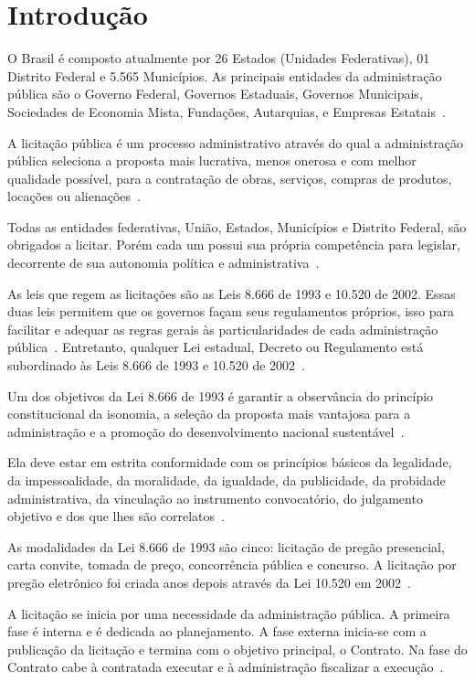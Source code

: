 \chapter*[Introdução]{Introdução}

O Brasil é composto atualmente por 26 Estados (Unidades Federativas), 01 Distrito Federal e 5.565 Municípios.
As principais entidades da administração pública são o Governo Federal, Governos Estaduais, Governos Municipais, Sociedades de Economia Mista, Fundações, Autarquias, e Empresas Estatais~\cite{thesing2012municipios}.

A licitação pública é um processo administrativo através do qual a administração pública seleciona a proposta mais lucrativa, menos onerosa e com melhor qualidade possível, para a contratação de obras, serviços, compras de produtos, locações ou alienações~\cite{l2300}.

Todas as entidades federativas, União, Estados, Municípios e Distrito Federal, são obrigados a licitar. 
Porém cada um possui sua própria competência para legislar, decorrente de sua autonomia política e administrativa~\cite{l8666}.

As leis que regem as licitações são as Leis 8.666 de 1993 e 10.520 de 2002. 
Essas duas leis permitem que os governos façam seus regulamentos próprios, isso para facilitar e adequar as regras gerais às particularidades de cada administração pública~\cite{123}.
Entretanto, qualquer Lei estadual, Decreto ou Regulamento está subordinado às Leis 8.666 de 1993 e 10.520 de 2002~\cite{123}. 

Um dos objetivos da Lei 8.666 de 1993 é garantir a observância do princípio constitucional da isonomia, a seleção da proposta mais vantajosa para a administração e a promoção do desenvolvimento nacional sustentável~\cite{l8666}.

Ela deve estar em estrita conformidade com os princípios básicos da legalidade, da impessoalidade, da moralidade, da igualdade, da publicidade, da probidade administrativa, da vinculação ao instrumento convocatório, do julgamento objetivo e dos que lhes são correlatos~\cite{l8666}.

As modalidades da Lei 8.666 de 1993 são cinco: licitação de pregão presencial, carta convite, tomada de preço, concorrência pública e concurso. 
A licitação por pregão eletrônico foi criada anos depois através da Lei 10.520 em 2002~\cite{l10529}.

A licitação se inicia por uma necessidade da administração pública. 
A primeira fase é interna e é dedicada ao planejamento. 
A fase externa inicia-se com a publicação da licitação e termina com o objetivo principal, o Contrato. 
Na fase do Contrato cabe à contratada executar e à administração fiscalizar a execução~\cite{camarao2013fase}.

